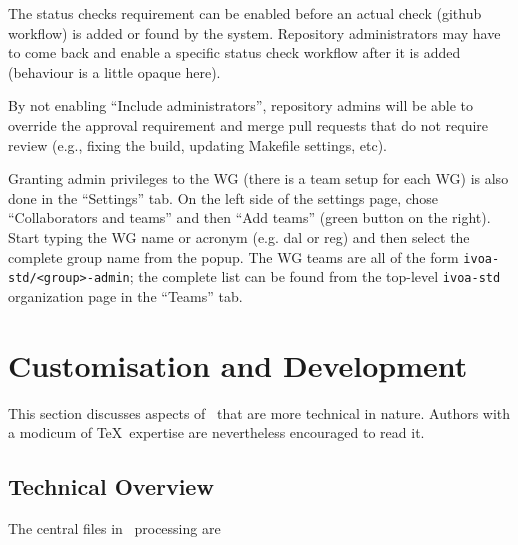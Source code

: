 \documentclass[11pt,a4paper]{ivoa}
\begin{document}
The status checks requirement can be enabled before an actual check (github workflow) is
added or found by the system. Repository administrators may have to come back and enable a
specific status check workflow after it is added (behaviour is a little opaque here).

By not enabling ``Include administrators'', repository admins will be able to override the
approval requirement and merge pull requests that do not require review (e.g., fixing the build,
updating Makefile settings, etc).

Granting admin privileges to the WG (there is a team setup for each WG) is also done in the
``Settings'' tab. On the left side of the settings page, chose ``Collaborators and teams''
and then ``Add teams'' (green button on the right). Start typing the WG name or acronym (e.g.
dal or reg) and then select the complete group name from the popup. The WG teams are all
of the form \verb|ivoa-std/<group>-admin|; the complete list can be found from the top-level
\verb|ivoa-std| organization page in the ``Teams'' tab.

\section{Customisation and Development}
\label{sect:impl}

This section discusses aspects of \ivoatex\ that are more technical in
nature.  Authors with a modicum of \TeX\ expertise are nevertheless
encouraged to read it.

\subsection{Technical Overview}

The central files in \ivoatex\ processing are
\end{document}
